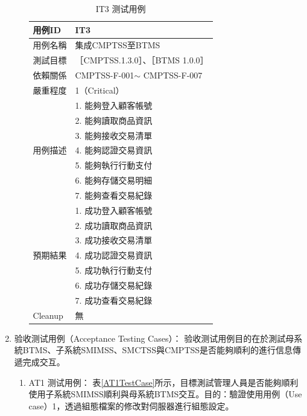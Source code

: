 \begin{enumerate}
\begin{enumerate}
						\begin{table}[!htbp]
						\caption{IT3 测试用例} %
						\centering %
						\label{IT3TestCase} %
						\begin{tabular}{|l|l|}
						\hline
						用例ID & IT3 \\ \hline
						用例名稱 & 集成CMPTSS至BTMS \\ \hline
						測試目標 & {［}CMPTSS.1.3.0{］}、{［}BTMS 1.0.0{］} \\ \hline
						依賴關係 & CMPTSS-F-001$\sim$ CMPTSS-F-007 \\ \hline
						嚴重程度 & 1（Critical） \\ \hline
						\multirow{7}{*}{用例描述} & 1.     能夠登入顧客帳號 \\ \cline{2-2} 
						 & 2.     能夠讀取商品資訊 \\ \cline{2-2} 
						 & 3.     能夠接收交易清單 \\ \cline{2-2} 
						 & 4.     能夠認證交易資訊 \\ \cline{2-2} 
						 & 5.     能夠執行行動支付 \\ \cline{2-2} 
						 & 6.     能夠存儲交易明細 \\ \cline{2-2} 
						 & 7.     能夠查看交易紀錄 \\ \hline
						\multirow{7}{*}{預期結果} & 1.     成功登入顧客帳號 \\ \cline{2-2} 
						 & 2.     成功讀取商品資訊 \\ \cline{2-2} 
						 & 3.     成功接收交易清單 \\ \cline{2-2} 
						 & 4.     成功認證交易資訊 \\ \cline{2-2} 
						 & 5.     成功執行行動支付 \\ \cline{2-2} 
						 & 6.     成功存儲交易紀錄 \\ \cline{2-2} 
						 & 7.     成功查看交易紀錄 \\ \hline
						Cleanup & 無 \\ \hline
						\end{tabular}
						\end{table}
				\end{enumerate}

		\item 验收测试用例（Acceptance Testing Cases）：
			验收测试用例目的在於測試母系統BTMS、子系統SMIMSS、SMCTSS與CMPTSS是否能夠順利的進行信息傳遞完成交互。

			\begin{enumerate}
				\item AT1 测试用例：
					表\ref{AT1TestCase}所示，目標測試管理人員是否能夠順利使用子系統SMIMSS順利與母系統BTMS交互。目的：驗證使用用例（Use case）1，透過組態檔案的修改對伺服器進行組態設定。


\end{enumerate}
\end{enumerate}
